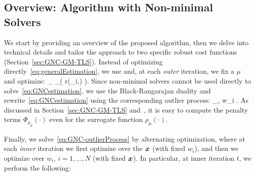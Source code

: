 
\subsection{Overview: \GNC Algorithm with Non-minimal Solvers} %
\label{sec:GNC-algorithm-overview}

We start by providing an overview of the proposed algorithm, then we delve into technical details and 
tailor the approach to two specific robust cost functions (Section~\ref{sec:GNC-GM-TLS}).  
Instead of optimizing directly~\eqref{eq:generalEstimation}, we use \GNC and, 
at each \emph{outer} iteration, we fix a $\mu$ and optimize: 
%
\bea \label{eq:GNCestimation}
\min_{\vxx \in \calX} \sumAllPointsi \rho_\mu( r(\vy_i,\vxx) ).
\eea 
%
Since non-minimal solvers cannot be used directly to solve~\eqref{eq:GNCestimation}, 
we use the Black-Rangarajan duality and rewrite~\eqref{eq:GNCestimation} using the corresponding outlier process:
%
\bea \label{eq:GNC-outlierProcess}
\min_{\vxx \in \calX, w_i \in [0,1]} \sumAllPointsi  {}.
\eea 
%
As discussed in Section~\ref{sec:GNC-GM-TLS} and~\cite{Black96ijcv-unification}, it is easy to compute the penalty terms $\Phi_{\rho_\mu}(\cdot)$ even for the surrogate function $\rho_\mu(\cdot)$. 

Finally, we solve~\eqref{eq:GNC-outlierProcess} by alternating optimization, where  
 at each \emph{inner} iteration we first optimize over the ${\bm x}$ (with fixed $w_i$), and 
 then we optimize over $w_i$, $i=1,\ldots,N$ (with fixed ${\bm x}$).  %
 In particular, at inner iteration $t$, we perform the following:

